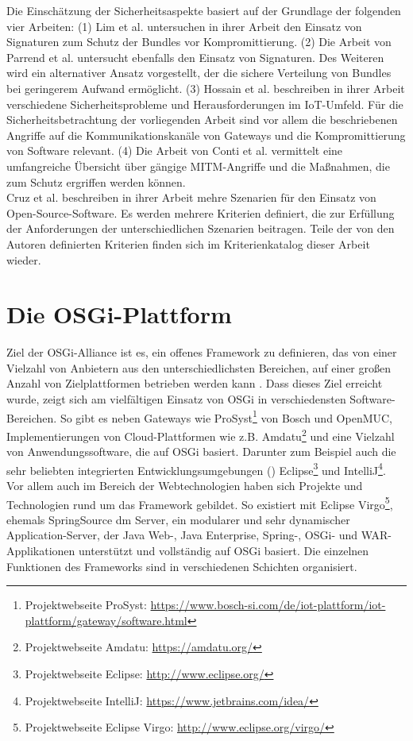 Die Einschätzung der Sicherheitsaspekte basiert auf der Grundlage der folgenden vier Arbeiten:
(1) Lim et al. \cite{bundle_auth} untersuchen in ihrer Arbeit den Einsatz von Signaturen zum Schutz der Bundles vor Kompromittierung. 
(2) Die Arbeit von Parrend et al. \cite{sfelix} untersucht ebenfalls den Einsatz von Signaturen. Des Weiteren wird
ein alternativer Ansatz vorgestellt, der die sichere Verteilung von Bundles bei geringerem Aufwand ermöglicht.
(3) Hossain et al. \cite{iot_security_issues} beschreiben in ihrer Arbeit verschiedene Sicherheitsprobleme und Herausforderungen im \ac{IoT}-Umfeld.
Für die Sicherheitsbetrachtung der vorliegenden Arbeit sind vor allem die beschriebenen Angriffe auf die Kommunikationskanäle von Gateways und die Kompromittierung von Software relevant.
(4) Die Arbeit von Conti et al. \cite{man_middle} vermittelt eine umfangreiche Übersicht über gängige \ac{MITM}-Angriffe und die Maßnahmen, die zum Schutz ergriffen werden können.\\

Cruz et al. \cite{evaluation_criteria} beschreiben in ihrer Arbeit mehre Szenarien für den Einsatz von Open-Source-Software.
Es werden mehrere Kriterien definiert, die zur Erfüllung der Anforderungen der unterschiedlichen Szenarien beitragen.
Teile der von den Autoren definierten Kriterien finden sich im Kriterienkatalog dieser Arbeit wieder.

\section{Die OSGi-Plattform}
\label{osgi_grundlagen}
Ziel der \ac{OSGi}-Alliance ist es, ein offenes Framework zu definieren, das von einer Vielzahl von Anbietern aus den unterschiedlichsten Bereichen, auf 
einer großen Anzahl von Zielplattformen betrieben werden kann \cite[S. 9]{osgi_r6}.
Dass dieses Ziel erreicht wurde, zeigt sich am vielfältigen Einsatz von \ac{OSGi} in verschiedensten Software-Bereichen.
So gibt es neben Gateways wie ProSyst\footnote{Projektwebseite ProSyst: \url{https://www.bosch-si.com/de/iot-plattform/iot-plattform/gateway/software.html}}
von Bosch und OpenMUC, Implementierungen von Cloud-Plattformen wie z.B. Amdatu\footnote{Projektwebseite Amdatu: \url{https://amdatu.org/}} und eine Vielzahl von Anwendungssoftware, 
die auf \ac{OSGi} basiert. Darunter zum Beispiel auch die sehr beliebten integrierten Entwicklungsumgebungen () Eclipse\footnote{Projektwebseite Eclipse: \url{http://www.eclipse.org/}}
und IntelliJ\footnote{Projektwebseite IntelliJ: \url{https://www.jetbrains.com/idea/}}.
Vor allem auch im Bereich der Webtechnologien haben sich Projekte und Technologien rund um das Framework gebildet.
So existiert mit Eclipse Virgo\footnote{Projektwebseite Eclipse Virgo: \url{http://www.eclipse.org/virgo/}}, ehemals SpringSource dm Server,
ein modularer und sehr dynamischer Application-Server, der Java Web-, Java Enterprise, Spring-, \ac{OSGi}- und WAR-Applikationen unterstützt und vollständig auf \ac{OSGi} basiert.
Die einzelnen Funktionen des Frameworks sind in verschiedenen Schichten organisiert. 

